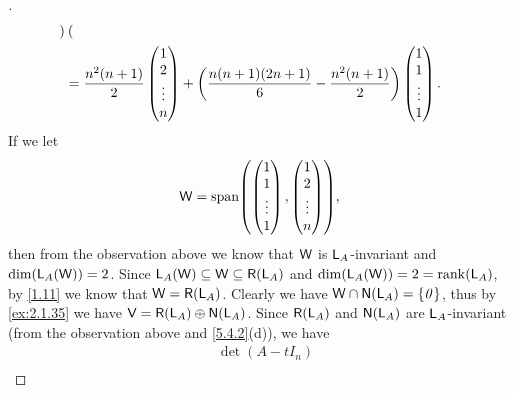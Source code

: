 \begin{proof}[]
\begin{align*}
\begin{pmatrix}
		     \end{pmatrix}                         \\
		 & = \frac{n^2(n + 1)}{2} \begin{pmatrix}
			                          1      \\
			                          2      \\
			                          \vdots \\
			                          n
		                          \end{pmatrix} + \left\lparen\frac{n(n + 1)(2n + 1)}{6} - \frac{n^2(n + 1)}{2}\right\rparen \begin{pmatrix}
			                                                                                                 1      \\
			                                                                                                 1      \\
			                                                                                                 \vdots \\
			                                                                                                 1
		                                                                                                 \end{pmatrix}.
	\end{align*}
	If we let
	\[
		\W = \spn{\begin{pmatrix}
				1      \\
				1      \\
				\vdots \\
				1
			\end{pmatrix}, \begin{pmatrix}
				1      \\
				2      \\
				\vdots \\
				n
			\end{pmatrix}},
	\]
	then from the observation above we know that \(\mathsf{W}\) is \(\mathsf{L}_A\)-invariant and \(\dim(\mathsf{L}_A(\mathsf{W})) = 2\).
	Since \(\L_A(\W) \subseteq \W \subseteq \rg{\L_A}\) and \(\dim(\L_A(\W)) = 2 = \rk{\L_A}\), by \cref{1.11} we know that \(\W = \rg{\L_A}\).
	Clearly we have \(\W \cap \ns{\L_A} = \set{\zv}\), thus by \cref{ex:2.1.35} we have \(\V = \rg{\L_A} \oplus \ns{\L_A}\).
	Since \(\rg{\L_A}\) and \(\ns{\L_A}\) are \(\mathsf{L}_A\)-invariant (from the observation above and \cref{5.4.2}(d)), we have
	\begin{align*}
		 & \det(A - t I_n)                                                                                                                        \\

\end{align*}
\end{proof}

